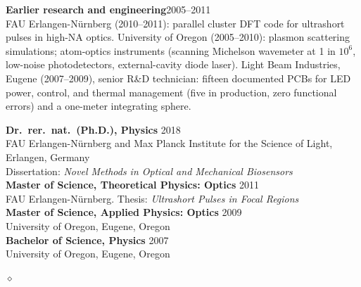 \documentclass{webster-resume}
\newlength{\secgap}\setlength{\secgap}{0.32cm}
\newcommand{\seclabel}[1]{\llap{{\small\bfseries #1}\hskip\secgap}}
\newcommand{\secsp}{\par\addvspace{0.75em plus 0.2em}}
\newcommand{\rsection}[1]{\secsp\noindent\seclabel{#1}\ignorespaces}
\newcommand{\lsection}[1]{\seclabel{#1}$\diamond$}
\newenvironment{list3}{
  \begin{list}{$\diamond$}{%
      \setlength{\itemsep}{-0.05in}
      \setlength{\parsep}{.05in} \setlength{\parskip}{0in}
      \setlength{\topsep}{0in} \setlength{\partopsep}{0in}
      \setlength{\leftmargin}{0.2in}}}{\end{list}}
\newenvironment{resitem}[1][]{%
  \par\addvspace{0.5em}\noindent\def\resdate{\hfill{\small #1}}%
  \begin{minipage}{\textwidth}\noindent}{\end{minipage}\par}
\begin{document}
\begin{resitem}[2005--2011]
{\bf Earlier research and engineering}\resdate\\
FAU Erlangen-N\"urnberg (2010--2011): parallel cluster DFT code for
ultrashort pulses in high-NA optics.  University of Oregon (2005--2010):
plasmon scattering simulations; atom-optics instruments (scanning Michelson
wavemeter at 1 in $10^{6}$, low-noise photodetectors, external-cavity diode
laser).  Light Beam Industries, Eugene (2007--2009), senior R\&D technician:
fifteen documented PCBs for LED power, control, and thermal management (five
in production, zero functional errors) and a one-meter integrating sphere.
\end{resitem}

\rsection{Education}%
{\bf Dr.\ rer.\ nat.\ (Ph.D.), Physics} \hfill 2018\\
\hspace*{1em}FAU Erlangen-N\"urnberg and Max Planck Institute for the Science of Light, Erlangen, Germany\\
\hspace*{1em}Dissertation: \emph{Novel Methods in Optical and Mechanical Biosensors}
\vspace{0.2em}
\\
{\bf Master of Science, Theoretical Physics: Optics} \hfill 2011\\
\hspace*{1em}FAU Erlangen-N\"urnberg.  Thesis: \emph{Ultrashort Pulses in Focal Regions}
\vspace{0.2em}
\\
{\bf Master of Science, Applied Physics: Optics} \hfill 2009\\
\hspace*{1em}University of Oregon, Eugene, Oregon
\vspace{0.2em}
\\
{\bf Bachelor of Science, Physics} \hfill 2007\\
\hspace*{1em}University of Oregon, Eugene, Oregon

\secsp
\begin{list3}
\item[\lsection{Publications}] 
\item {}
\item {}
\item {}
\end{list3}
\end{document}
